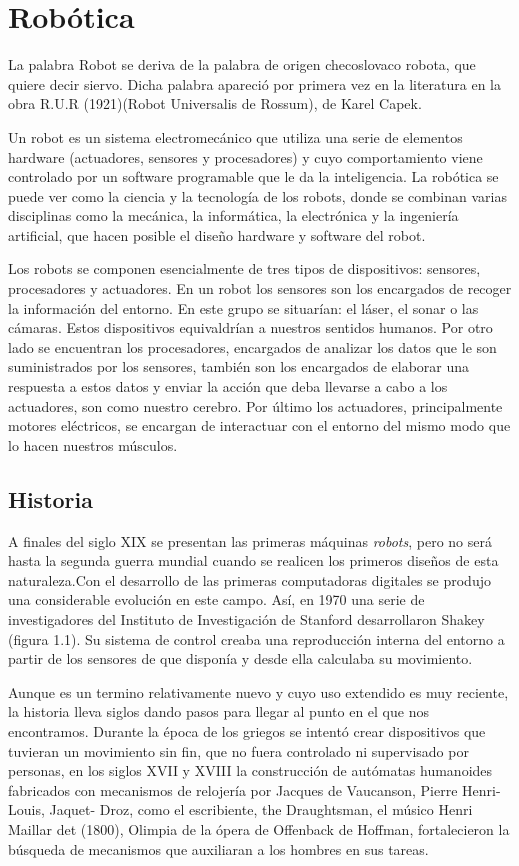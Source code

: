\section{Robótica}
\label{sec:robotica}

La palabra Robot se deriva de la palabra de origen checoslovaco robota, que quiere decir siervo. Dicha palabra apareció por primera vez en la literatura en la obra R.U.R (1921)(Robot Universalis de Rossum), de Karel Capek.

Un robot es un sistema electromecánico que utiliza una serie de elementos hardware
(actuadores, sensores y procesadores) y cuyo comportamiento viene controlado por un
software programable que le da la inteligencia. La robótica se puede ver como la ciencia
y la tecnología de los robots, donde se combinan varias disciplinas como la mecánica, la
informática, la electrónica y la ingeniería artificial, que hacen posible el diseño hardware y software del robot.

Los robots se componen esencialmente de tres tipos de dispositivos: sensores,
procesadores y actuadores. En un robot los sensores son los encargados de recoger
la información del entorno. En este grupo se situarían: el láser, el sonar o las
cámaras. Estos dispositivos equivaldrían a nuestros sentidos humanos. Por otro lado se
encuentran los procesadores, encargados de analizar los datos que le son suministrados
por los sensores, también son los encargados de elaborar una respuesta a estos datos y
enviar la acción que deba llevarse a cabo a los actuadores, son como nuestro cerebro.
Por último los actuadores, principalmente motores eléctricos, se encargan de interactuar
con el entorno del mismo modo que lo hacen nuestros músculos.


\subsection{Historia}
\label{subsec:historia}
A finales del siglo XIX se presentan las primeras máquinas \textit{robots}, pero no
será hasta la segunda guerra mundial cuando se realicen los primeros diseños de esta
naturaleza.Con el desarrollo de las primeras computadoras digitales se produjo una
considerable evolución en este campo. Así, en 1970 una serie de investigadores del
Instituto de Investigación de Stanford desarrollaron Shakey (figura 1.1). Su sistema de
control creaba una reproducción interna del entorno a partir de los sensores de que
disponía y desde ella calculaba su movimiento.

Aunque es un termino relativamente nuevo y cuyo uso extendido es muy reciente, la historia lleva siglos dando pasos para llegar al punto en el que nos encontramos.
Durante la época de los griegos se intentó crear dispositivos que tuvieran un movimiento sin fin, que no fuera controlado ni supervisado por personas, en los siglos XVII y XVIII la construcción de autómatas humanoides fabricados con mecanismos de relojería por Jacques de Vaucanson, Pierre Henri-Louis, Jaquet- Droz, como el escribiente, the Draughtsman, el músico Henri Maillar det (1800), Olimpia de la ópera de Offenback de Hoffman, fortalecieron la búsqueda de mecanismos que auxiliaran a los hombres en sus tareas.

